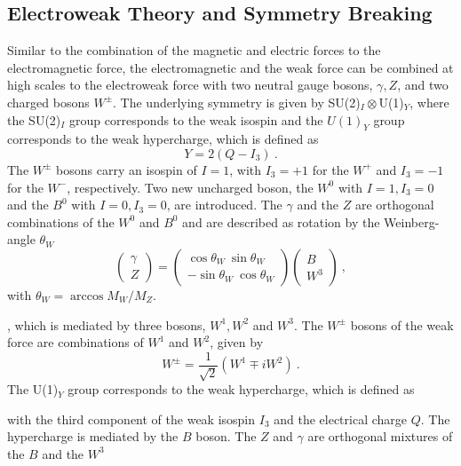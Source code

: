 \subsection{Electroweak Theory and Symmetry Breaking}
\label{subsec:theo:EWK}
Similar to the combination of the magnetic and electric forces to the electromagnetic force, the electromagnetic and the weak force can be combined at high scales to the electroweak force \cite{EWK} with two neutral gauge bosons, $\gamma , Z$, and two charged bosons $W^\pm$. The underlying symmetry is given by SU(2)$_I\otimes$U(1)$_Y$, where the SU(2)$_I$ group corresponds to the weak isospin and the $U(1)_Y$ group corresponds to the weak hypercharge, which is defined as
\begin{equation}
Y=2(Q-I_3) ~.
\end{equation} 
The $W^\pm$ bosons carry an isospin of $I=1$, with $I_3=+1$ for the $W^+$ and $I_3=-1$ for the $W^-$, respectively. Two new uncharged boson, the $W^0$ with $I=1,I_3=0$ and the $B^0$ with $I=0,I_3=0$, are introduced. The $\gamma$ and the $Z$ are orthogonal combinations of the $W^0$ and $B^0$ and are described as rotation by the Weinberg-angle $\theta_W$
\begin{equation}
\left( \begin{array}{c} \gamma \\ Z \end{array} \right) = \left( \begin{array}{c} \cos \theta_W ~  \sin \theta_W \\ -\sin \theta_W ~  \cos \theta_W \end{array} \right) \left( \begin{array}{c} B \\ W^3 \end{array} \right) ~,
\end{equation}
with $\theta_W=\arccos M_W/M_Z$.



, which is mediated by three bosons, $W^1,W^2$ and $W^3$. The $W^\pm$ bosons of the weak force are combinations of $W^1$ and $W^2$, given by
\begin{equation}
W^\pm=\frac{1}{\sqrt{2}}\left( W^1 \mp iW^2 \right) ~.
\end{equation}  
The U(1)$_Y$ group corresponds to the weak hypercharge, which is defined as

with the third component of the weak isospin $I_3$ and the electrical charge $Q$. The hypercharge is mediated by the $B$ boson. The $Z$ and $\gamma$ are orthogonal mixtures of the $B$ and the $W^3$




